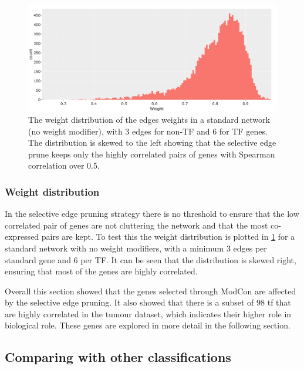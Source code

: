 \begin{figure}[!b]   
\centering
\includegraphics[width=1.0\textwidth,height=1.0\textheight,keepaspectratio]{Sections/Network_I/Resources/selective_pruning/weight_distrib.png}
  \caption[Weight distribution]{The weight distribution of the edges weights in a standard network (no weight modifier), with 3 edges for non-TF and 6 for TF genes. The distribution is skewed to the left showing that the selective edge prune keeps only the highly correlated pairs of genes with Spearman correlation over 0.5. }
\label{fig:N_I:weight_distrib}
\end{figure}

\subsubsection*{Weight distribution}

In the selective edge pruning strategy there is no threshold to ensure that the low correlated pair of genes are not cluttering the network and that the most co-expressed pairs are kept. To test this the weight distribution is plotted in \cref{fig:N_I:weight_distrib} for a standard network with no weight modifiers, with a minimum 3 edges per standard gene and 6 per TF. It can be seen that the distribution is skewed right, ensuring that most of the genes are highly correlated.


Overall this section showed that the genes selected through ModCon are affected by the selective edge pruning. It also showed that there is a subset of 98 \acrlong{tf} that are highly correlated in the tumour dataset, which indicates their higher role in biological role. These genes are explored in more detail in the following section.


\subsection{Comparing with other classifications} \label{s:N_I:sel_tfs_mibc}

